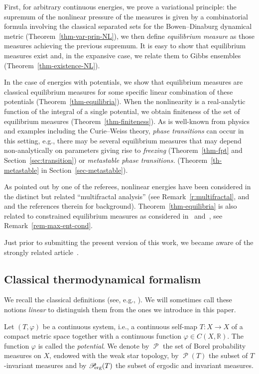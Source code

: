 \documentclass[10pt]{amsart}
\theoremstyle{definition}\newtheorem{defi}[theo]{Definition}\newtheorem{rema}[theo]{Remark}\newtheorem{exam}[theo]{Example}\newtheorem{exem}[theo]{Example}\newtheorem{nota}[theo]{Notation}
\theoremstyle{plain}
\theoremstyle{plain}
\newcommand\Proberg{\Prob_{\kern-3pt\mathrm{erg}}}
\newcommand\Prob{{\operatorname{\mathscr{P}}}}
\newcommand{\pot}{\varphi}
\newcounter{In}
\newcommand*\8{\infty}
\newcommand\RR{\mathbb{R}}
\begin{document}
First, for arbitrary continuous energies, we prove a variational principle: the supremum of the nonlinear pressure of the measures is given by a combinatorial formula involving the classical separated sets for the Bowen--Dinaburg dynamical metric (Theorem~\ref{thm-var-prin-NL}), we then define \emph{equilibrium measure} as those measures achieving the previous supremum. It is easy to show that equilibrium measures exist and, in the expansive case, we relate them to Gibbs ensembles (Theorem~\ref{thm-existence-NL}).

In the case of energies with potentials, we show that equilibrium measures are classical equilibrium measures for some specific linear combination of these potentials (Theorem~\ref{thm-equilibria}). When the nonlinearity is a real-analytic function of the integral of a single potential, we obtain finiteness of the set of equilibrium measures (Theorem~\ref{thm-finiteness}). As is well-known from physics and examples including the Curie--Weiss theory, \emph{phase transitions} can occur in this setting, e.g., there may be several equilibrium measures that may depend non-analytically on parameters giving rise to \emph{freezing} (Theorem~\ref{thm-fpt} and Section~\ref{sec:transition}) or \emph{metastable phase transitions.} (Theorem~\ref{th-metastable} in Section~\ref{sec-metastable}).

As pointed out by one of the referees, nonlinear energies have been considered in the distinct but related ``multifractal analysis'' (see Remark~\ref{r:multifractal}, and~\cite{Climenhaga2014} and the references therein for background). Theorem~\ref{thm-equilibria} is also related to constrained equilibrium measures as considered in~\cite{KW2015} and~\cite{GKLM}, see Remark~\ref{rem-max-ent-cond}.

Just prior to submitting the present version of this work, we became aware of the strongly related article~\cite{BarreiraHolanda2021}.


\subsection{Classical thermodynamical formalism}
We recall the classical definitions (see, e.g., \cite{Walters-book}). We will sometimes call these notions \emph{linear} to distinguish them from the ones we introduce in this paper.


Let $(T,\pot)$ be a continuous system, i.e., a continuous self-map $T:X\to X$ of a compact metric space together with a continuous function $\pot \in C(X,\RR)$. The function $\pot$ is called the \emph{potential}. We denote by $\Prob$ the set of Borel probability measures on $X$, endowed with the weak star topology, by $\Prob(T)$ the subset of $T$-invariant measures and by $\Proberg(T)$ the subset of ergodic and invariant measures.
\end{document}
